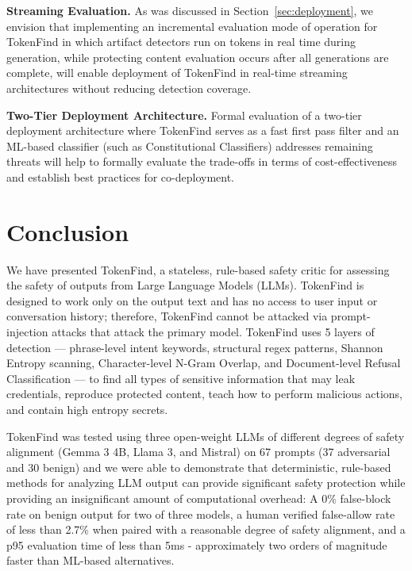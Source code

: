 \documentclass[11pt]{article}
\begin{document}
\textbf{Streaming Evaluation.} As was discussed in Section~\ref{sec:deployment}, we envision that implementing an
incremental evaluation mode of operation for TokenFind in which artifact detectors run on tokens
in real time during generation, while protecting content evaluation occurs after all generations
are complete, will enable deployment of TokenFind in real-time streaming architectures without
reducing detection coverage.

\textbf{Two-Tier Deployment Architecture.} Formal evaluation of a two-tier deployment architecture where TokenFind serves as a fast first pass filter and an ML-based classifier (such as Constitutional Classifiers) addresses remaining threats will help to formally evaluate the trade-offs in terms
of cost-effectiveness and establish best practices for co-deployment.

\section{Conclusion}
\label{sec:conclusion}

We have presented TokenFind, a stateless, rule-based safety critic for assessing the safety of outputs
from Large Language Models (LLMs). TokenFind is designed to work only on the output text and
has no access to user input or conversation history; therefore, TokenFind cannot be attacked via
prompt-injection attacks that attack the primary model. TokenFind uses 5 layers of detection
--- phrase-level intent keywords, structural regex patterns, Shannon Entropy scanning, Character-level N-Gram Overlap, and Document-level Refusal Classification --- to find all types of sensitive
information that may leak credentials, reproduce protected content, teach how to perform malicious
actions, and contain high entropy secrets.

TokenFind was tested using three open-weight LLMs of different degrees of safety alignment
(Gemma 3 4B, Llama 3, and Mistral) on 67 prompts (37 adversarial and 30 benign) and we were
able to demonstrate that deterministic, rule-based methods for analyzing LLM output can provide
significant safety protection while providing an insignificant amount of computational overhead: A
0\% false-block rate on benign output for two of three models, a human verified false-allow rate of
less than 2.7\% when paired with a reasonable degree of safety alignment, and a p95 evaluation time
of less than 5ms - approximately two orders of magnitude faster than ML-based alternatives.
\end{document}
